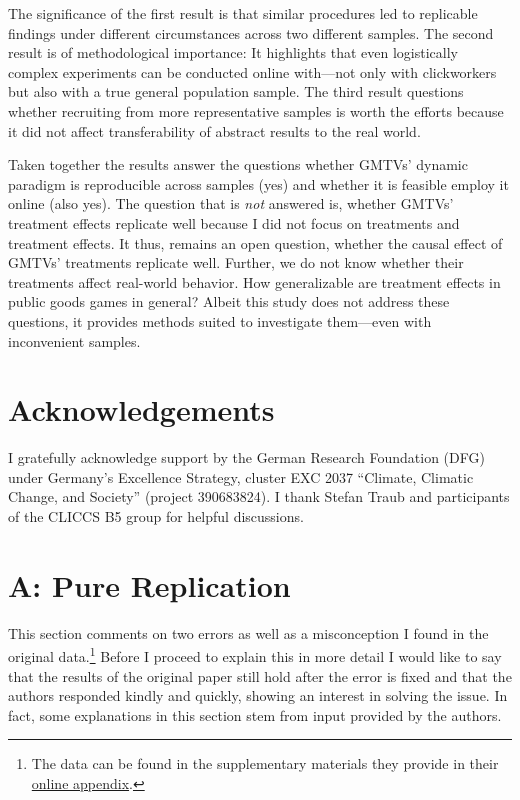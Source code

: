 \documentclass[
  authoryear,
  review,
  3p,
  onecolumn]{elsarticle}
\begin{document}
The significance of the first result is that similar procedures led to
replicable findings under different circumstances across two different
samples. The second result is of methodological importance: It
highlights that even logistically complex experiments can be conducted
online with---not only with clickworkers but also with a true general
population sample. The third result questions whether recruiting from
more representative samples is worth the efforts because it did not
affect transferability of abstract results to the real world.

Taken together the results answer the questions whether GMTVs' dynamic
paradigm is reproducible across samples (yes) and whether it is feasible
employ it online (also yes). The question that is \emph{not} answered
is, whether GMTVs' treatment effects replicate well because I did not
focus on treatments and treatment effects. It thus, remains an open
question, whether the causal effect of GMTVs' treatments replicate well.
Further, we do not know whether their treatments affect real-world
behavior. How generalizable are treatment effects in public goods games
in general? Albeit this study does not address these questions, it
provides methods suited to investigate them---even with inconvenient
samples.

\hypertarget{acknowledgements}{%
\section{Acknowledgements}\label{acknowledgements}}

I gratefully acknowledge support by the German Research Foundation (DFG)
under Germany's Excellence Strategy, cluster EXC 2037 ``Climate,
Climatic Change, and Society'' (project 390683824). I thank Stefan Traub
and participants of the CLICCS B5 group for helpful discussions.

\newpage{}

\hypertarget{a-pure-replication}{%
\section{A: Pure Replication}\label{a-pure-replication}}

This section comments on two errors as well as a misconception I found
in the original data.\footnote{The data can be found in the
  supplementary materials they provide in their
  \href{https://www.sciencedirect.com/science/article/pii/S0047272717300361\#s0115}{online
  appendix}.} Before I proceed to explain this in more detail I would
like to say that the results of the original paper still hold after the
error is fixed and that the authors responded kindly and quickly,
showing an interest in solving the issue. In fact, some explanations in
this section stem from input provided by the authors.
\end{document}
